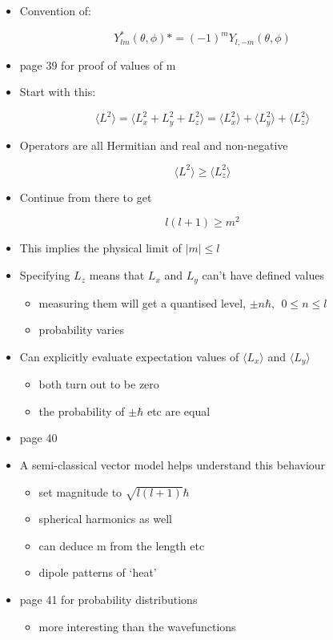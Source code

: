 \documentclass[a4paper,11pt,normalem]{article}
\begin{document}
\begin{itemize}
\item
  Convention of:
\end{itemize}
\[
    Y_{lm}^{*}(\theta, \phi )* = (-1)^m Y_{l,-m}(\theta, \phi)
\]
\begin{itemize}
\item
  page 39 for proof of values of m
\item
  Start with this:
\end{itemize}
\[
    \langle L^2 \rangle = \langle L_{x}^2 + L_{y}^2 + L_{z}^2 \rangle = \langle L_{x}^2\rangle + \langle L_{y}^2 \rangle + \langle L_{z}^2 \rangle
\]
\begin{itemize}
\item
  Operators are all Hermitian and real and non-negative
\end{itemize}
\[
    \langle L^2 \rangle \geq \langle L_{z}^2 \rangle
\]
\begin{itemize}
\item
  Continue from there to get
\end{itemize}
\[
    l(l + 1) \geq m^2
\]
\begin{itemize}
\item
  This implies the physical limit of \(|m| \leq l\)
\item
  Specifying \(L_z\) means that \(L_x\) and \(L_y\) can't have defined
  values
  \begin{itemize}
  \item
    measuring them will get a quantised level,
    \(\pm n\hbar,~~ 0 \leq n \leq l\)
  \item
    probability varies
  \end{itemize}
\item
  Can explicitly evaluate expectation values of \(\langle L_x \rangle\)
  and \(\langle L_y \rangle\)
  \begin{itemize}
  \item
    both turn out to be zero
  \item
    the probability of \(\pm \hbar\) etc are equal
  \end{itemize}
\item
  page 40
\item
  A semi-classical vector model helps understand this behaviour
  \begin{itemize}
  \item
    set magnitude to \(\sqrt{l(l + 1)}\hbar\)
  \item
    spherical harmonics as well
  \item
    can deduce m from the length etc
  \item
    dipole patterns of `heat'
  \end{itemize}
\item
  page 41 for probability distributions
  \begin{itemize}
  \item
    more interesting than the wavefunctions
  \end{itemize}
\end{itemize}
\end{document}
